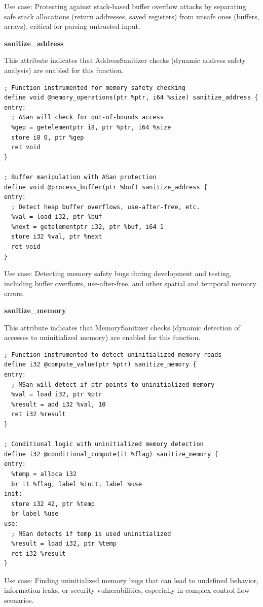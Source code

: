 Use case: Protecting against stack-based buffer overflow attacks by separating safe stack allocations (return addresses, saved registers) from unsafe ones (buffers, arrays), critical for parsing untrusted input.

\textbf{sanitize\_address}

This attribute indicates that AddressSanitizer checks (dynamic address safety analysis) are enabled for this function.

\begin{lstlisting}[style=ir]
; Function instrumented for memory safety checking
define void @memory_operations(ptr %ptr, i64 %size) sanitize_address {
entry:
  ; ASan will check for out-of-bounds access
  %gep = getelementptr i8, ptr %ptr, i64 %size
  store i8 0, ptr %gep
  ret void
}

; Buffer manipulation with ASan protection
define void @process_buffer(ptr %buf) sanitize_address {
entry:
  ; Detect heap buffer overflows, use-after-free, etc.
  %val = load i32, ptr %buf
  %next = getelementptr i32, ptr %buf, i64 1
  store i32 %val, ptr %next
  ret void
}
\end{lstlisting}

Use case: Detecting memory safety bugs during development and testing, including buffer overflows, use-after-free, and other spatial and temporal memory errors.

\textbf{sanitize\_memory}

This attribute indicates that MemorySanitizer checks (dynamic detection of accesses to uninitialized memory) are enabled for this function.

\begin{lstlisting}[style=ir]
; Function instrumented to detect uninitialized memory reads
define i32 @compute_value(ptr %ptr) sanitize_memory {
entry:
  ; MSan will detect if ptr points to uninitialized memory
  %val = load i32, ptr %ptr
  %result = add i32 %val, 10
  ret i32 %result
}

; Conditional logic with uninitialized memory detection
define i32 @conditional_compute(i1 %flag) sanitize_memory {
entry:
  %temp = alloca i32
  br i1 %flag, label %init, label %use
init:
  store i32 42, ptr %temp
  br label %use
use:
  ; MSan detects if temp is used uninitialized
  %result = load i32, ptr %temp
  ret i32 %result
}
\end{lstlisting}

Use case: Finding uninitialized memory bugs that can lead to undefined behavior, information leaks, or security vulnerabilities, especially in complex control flow scenarios.

